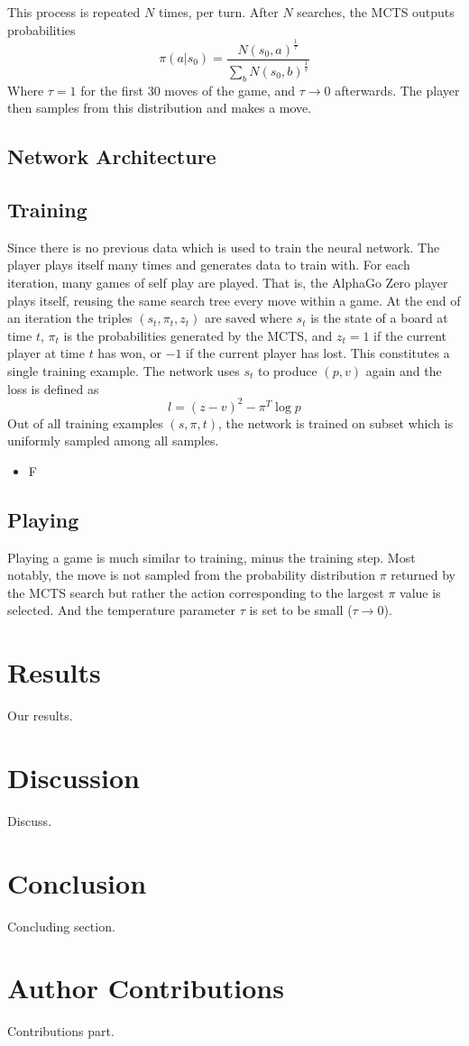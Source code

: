 \documentclass[12pt]{IEEEtran}
\begin{document}
		This process is repeated $N$ times, per turn. After $N$ searches,
		the MCTS outputs probabilities
		$$\pi(a|s_0)=\frac{N(s_0, a)^{\frac{1}{\tau}}}{\sum_b N(s_0,b)^{\frac{1}{\tau}}}$$
		Where $\tau=1$ for the first 30 moves of the game, and $\tau \rightarrow 0$ afterwards. The player then samples from this distribution and makes a move. 
		
	\subsection{Network Architecture}
	\subsection{Training}
		Since there is no previous data which is used to train the neural network. The player plays itself many times and generates data to train with.
		For each iteration, many games of self play are played. That is, the AlphaGo Zero player plays itself, reusing the same search tree every move within a game. At the end of an iteration the triples
		$(s_t, \pi_t, z_t)$ are saved where $s_t$ is the state of a board at time $t$, $\pi_t$ is the probabilities generated by the MCTS, and $z_t=1$ if the current player at time $t$ has won, or $-1$ if the current player has lost.
		This constitutes a single training example. The network uses $s_t$ to produce $(p, v)$ again and the loss is defined as
		$$l = (z-v)^2 - \pi^T\log{p}$$
		Out of all training examples $(s, \pi, t)$, the network is trained on subset which is uniformly sampled among all samples.
\begin{itemize}
  \item F
\end{itemize}
		
		
	\subsection{Playing}
		Playing a game is much similar to training, minus the training step. Most notably, the move is not sampled from the probability distribution $\pi$ returned by the MCTS search but rather the action corresponding to the largest $\pi$ value is selected. And the temperature parameter $\tau$ is set to be small ($\tau \rightarrow 0$).
\section{Results}
    Our results.

\section{Discussion}
    Discuss.

\section{Conclusion}
    Concluding section.





\section{Author Contributions}
    Contributions part.
\end{document}
